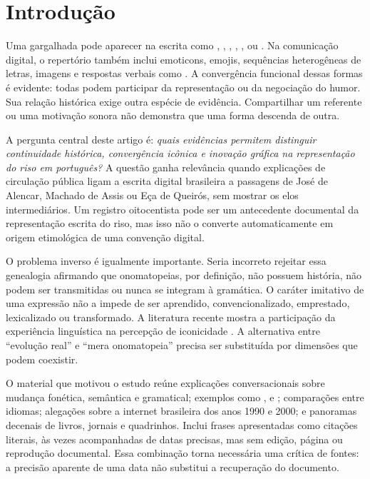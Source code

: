 \section{Introdução}
Uma gargalhada pode aparecer na escrita como , , , , ,  ou . Na comunicação digital, o repertório também inclui emoticons, emojis, sequências heterogêneas de letras, imagens e respostas verbais como . A convergência funcional dessas formas é evidente: todas podem participar da representação ou da negociação do humor. Sua relação histórica exige outra espécie de evidência. Compartilhar um referente ou uma motivação sonora não demonstra que uma forma descenda de outra.

A pergunta central deste artigo é: \emph{quais evidências permitem distinguir continuidade histórica, convergência icônica e inovação gráfica na representação do riso em português?} A questão ganha relevância quando explicações de circulação pública ligam a escrita digital brasileira a passagens de José de Alencar, Machado de Assis ou Eça de Queirós, sem mostrar os elos intermediários. Um registro oitocentista pode ser um antecedente documental da representação escrita do riso, mas isso não o converte automaticamente em origem etimológica de uma convenção digital.

O problema inverso é igualmente importante. Seria incorreto rejeitar essa genealogia afirmando que onomatopeias, por definição, não possuem história, não podem ser transmitidas ou nunca se integram à gramática. O caráter imitativo de uma expressão não a impede de ser aprendido, convencionalizado, emprestado, lexicalizado ou transformado. A literatura recente mostra a participação da experiência linguística na percepção de iconicidade \cite{iida2024}. A alternativa entre ``evolução real'' e ``mera onomatopeia'' precisa ser substituída por dimensões que podem coexistir.

O material que motivou o estudo reúne explicações conversacionais sobre mudança fonética, semântica e gramatical; exemplos como ,  e ; comparações entre idiomas; alegações sobre a internet brasileira dos anos 1990 e 2000; e panoramas decenais de livros, jornais e quadrinhos. Inclui frases apresentadas como citações literais, às vezes acompanhadas de datas precisas, mas sem edição, página ou reprodução documental. Essa combinação torna necessária uma crítica de fontes: a precisão aparente de uma data não substitui a recuperação do documento.

